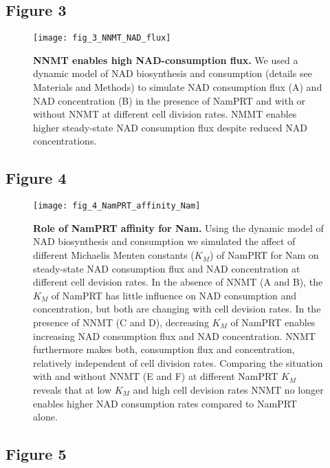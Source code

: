 \newpage


\subsection{Figure 3}

\begin{figure}[ht]
  \centering
  \texttt{[image: fig\_3\_NNMT\_NAD\_flux]}
  \caption{\textbf{NNMT enables high NAD-consumption flux.} We used a dynamic model of NAD biosynthesis and consumption (details see Materials and Methods) to simulate NAD consumption flux (A) and NAD concentration (B) in the presence of NamPRT and with or without NNMT at different cell division rates. NMMT enables higher steady-state NAD consumption flux despite reduced NAD concentrations.}
  \label{fig:NNMT_NAD_flux}
\end{figure}

\newpage


\subsection{Figure 4}

\begin{figure}[ht]
  \centering
  \texttt{[image: fig\_4\_NamPRT\_affinity\_Nam]}
  \caption{\textbf{Role of NamPRT affinity for Nam.} Using the dynamic model of NAD biosynthesis and consumption we simulated the affect of different Michaelis Menten constants ($K_M$) of NamPRT for Nam on steady-state NAD consumption flux and NAD concentration at different cell devision rates. In the absence of NNMT (A and B), the $K_M$ of NamPRT has little influence on NAD consumption and concentration, but both are changing with cell devision rates. In the presence of NNMT (C and D), decreasing $K_M$ of NamPRT enables increasing NAD consumption flux and NAD concentration. NNMT furthermore makes both, consumption flux and concentration, relatively independent of cell division rates. Comparing the situation with and without NNMT (E and F) at different NamPRT $K_M$ reveals that at low $K_M$ and high cell devision rates NNMT no longer enables higher NAD consumption rates compared to NamPRT alone.}
  \label{fig:NamPRT_affinity_Nam}
\end{figure}

\newpage


\subsection{Figure 5}


